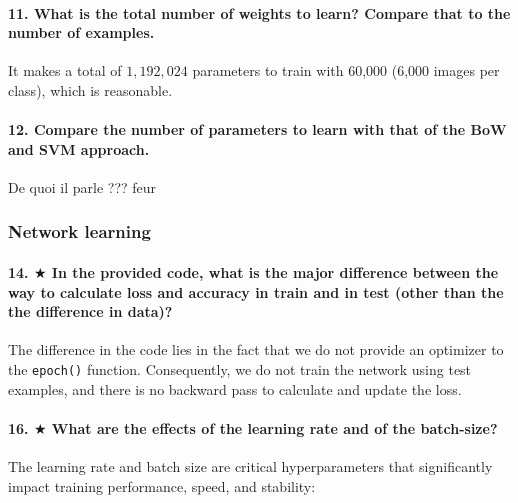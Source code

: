 \documentclass{article}
\theoremstyle{plain}%
\theoremstyle{definition}
\theoremstyle{remark}
\begin{document}
\paragraph{11. What is the total number of weights to learn? Compare that to the number of examples.}
It makes a total of $ 1,192,024 $ parameters to train with 60,000 (6,000 images per class), which is reasonable.

\paragraph{12. Compare the number of parameters to learn with that of the BoW and SVM approach.}
De quoi il parle ??? feur

\subsubsection{Network learning}
\paragraph{14. $ \bigstar $ In the provided code, what is the major difference between the way to calculate loss and accuracy in train and in test (other than the the difference in data)?}
The difference in the code lies in the fact that we do not provide an optimizer to the \texttt{epoch()} function. Consequently, we do not train the network using test examples, and there is no backward pass to calculate and update the loss.

\paragraph{16. $ \bigstar $ What are the effects of the learning rate and of the batch-size?}
The learning rate and batch size are critical hyperparameters that significantly impact training performance, speed, and stability:
\end{document}
